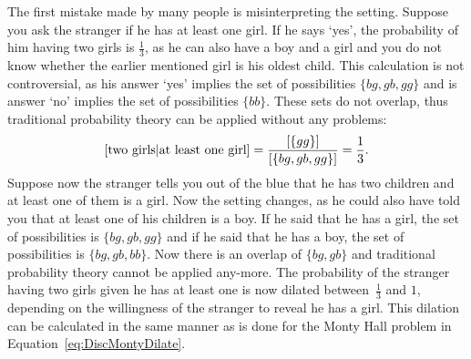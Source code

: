 \documentclass[a4paper]{report}
\theoremstyle{plain}
\theoremstyle{definition}
\theoremstyle{remark}
\numberwithin{equation}{chapter}
\let\P\relax
\DeclareMathOperator{\P}{\mathbb{P}}
\DeclareMathOperator{\1}{\mathbbm{1}}
\begin{document}
The first mistake made by many people is misinterpreting the setting. Suppose you ask the stranger if he has at least one girl. If he says `yes', the probability of him having two girls is $\frac{1}{3}$, as he can also have a boy and a girl and you do not know whether the earlier mentioned girl is his oldest child. This calculation is not controversial, as his answer `yes' implies the set of possibilities $\{bg, gb, gg\}$ and is answer `no' implies the set of possibilities $\{bb\}$. These sets do not overlap, thus traditional probability theory can be applied without any problems:
\begin{equation}
\P[\text{two girls}|\text{at least one girl}]=\frac{\P[\{gg\}]}{\P[\{bg, gb, gg\}]}=\frac{1}{3}.
\end{equation}
Suppose now the stranger tells you out of the blue that he has two children and at least one of them is a girl. Now the setting changes, as he could also have told you that at least one of his children is a boy. If he said that he has a girl, the set of possibilities is $\{bg, gb, gg\}$ and if he said that he has a boy, the set of possibilities is $\{bg, gb, bb\}$. Now there is an overlap of $\{bg, gb\}$ and traditional probability theory cannot be applied any-more. The probability of the stranger having two girls given he has at least one is now dilated between~$\frac{1}{3}$ and $1$, depending on the willingness of the stranger to reveal he has a girl. This dilation can be calculated in the same manner as is done for the Monty Hall problem in Equation~\ref{eq:DiscMontyDilate}.
\end{document}
